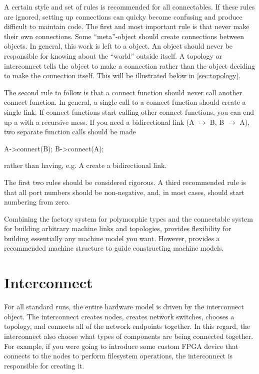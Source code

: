 A certain style and set of rules is recommended for all connectables.
If these rules are ignored, setting up connections can quicky become confusing and produce difficult to maintain code.
The first and most important rule is that  never make their own connections.
Some ``meta''-object should create connections between objects.
In general, this work is left to a  object.
An object should never be responsible for knowing about the ``world'' outside itself.
A topology or interconnect tells the object to make a connection rather than the object deciding to make the connection itself.
This will be illustrated below in \ref{sec:topology}.

The second rule to follow is that a connect function should never call another connect function.
In general, a single call to a connect function should create a single link.
If connect functions start calling other connect functions, you can end up a with a recursive mess.
If you need a bidirectional link (A $\rightarrow$ B, B $\rightarrow$ A),
two separate function calls should be made

\begin{CppCode}
A->connect(B);
B->connect(A);
\end{CppCode}

rather than having, e.g. A create a bidirectional link.

The first two rules should be considered rigorous. 
A third recommended rule is that all port numbers should be non-negative, and, in most cases, should start numbering from zero.


Combining the factory system for polymorphic types and the connectable system for building arbitrary machine links and topologies,
\sstmacro provides flexibility for building essentially any machine model you want.
However, \sstmacro provides a recommended machine structure to guide constructing machine models.

\section{Interconnect}
For all standard runs, the entire hardware model is driven by the interconnect object.
The interconnect creates nodes, creates network switches, chooses a topology, and connects all of the network endpoints together.
In this regard, the interconnect also choose what types of components are being connected together.
For example, if you were going to introduce some custom FPGA device that connects to the nodes to perform filesystem operations,
the interconnect is responsible for creating it.

